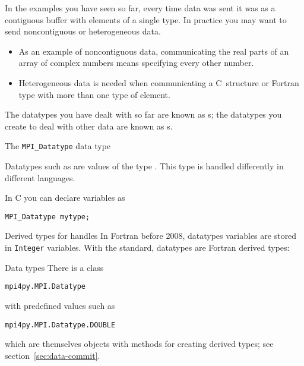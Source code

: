 

In the examples you have seen so far, every time data was sent
it was as a contiguous buffer with elements of a single type.
In practice you may want to send noncontiguous 
or heterogeneous data.
\begin{itemize}
\item As an example of noncontiguous data,
  communicating the real parts of an array of complex numbers
  means specifying every other number.
\item Heterogeneous data is needed when communicating a C~structure or Fortran type with more than one
  type of element.
\end{itemize}
The datatypes you have dealt with so far are known as
s;
the datatypes you create to deal with other data
are known as s.

 {The \texttt{MPI\_Datatype} data type}
\label{sec:mpi-datatype}

Datatypes such as  are values
of the type .
This type is handled differently in different languages.

In C you can declare variables as
\begin{lstlisting}
MPI_Datatype mytype;
\end{lstlisting}

\begin{fortrannote}{Derived types for handles}
  In Fortran before 2008, datatypes variables are stored in
  \lstinline{Integer} variables.
  With the  standard, datatypes are Fortran derived types:
\end{fortrannote}

\begin{pythonnote}{Data types}
  There is a class
\begin{lstlisting}
mpi4py.MPI.Datatype
\end{lstlisting}
  with predefined values such as 
\begin{lstlisting}
mpi4py.MPI.Datatype.DOUBLE
\end{lstlisting}
  which are themselves objects with methods
  for creating derived types;
  see section~\ref{sec:data-commit}.
\end{pythonnote}

